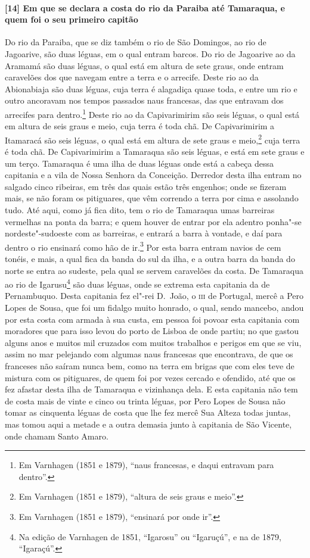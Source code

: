 \begin{linenumbers}
\paragraph{[14] Em que se declara a costa do rio da Paraiba até Tamaraqua, e quem foi o seu
primeiro capitão} \quad
Do rio da Paraiba, que se diz também o rio de São Domingos, ao rio de Jagoarive, são duas
léguas, em o qual entram barcos. Do rio de Jagoarive ao da Aramamá são duas léguas, o qual
está em altura de sete graus, onde entram caravelões dos que navegam entre a terra e o
arrecife. Deste rio ao da Abionabiaja são duas léguas, cuja terra é alagadiça quase toda,
e entre um rio e outro ancoravam nos tempos passados naus francesas, das que entravam dos
arrecifes para dentro.\footnote{ Em Varnhagen (1851 e 1879), ``naus francesas, e daqui
entravam para dentro''.} Deste rio ao da Capivarimirim são seis léguas, o qual está em
altura de seis graus e meio, cuja terra é toda chã. De Capivarimirim a Itamaracá são seis
léguas, o qual está em altura de sete graus e meio,\footnote{ Em Varnhagen (1851 e 1879),
``altura de seis graus e meio''.} cuja terra é toda chã. De Capivarimirim a Tamaraqua são
seis léguas, e está em sete graus e um terço. Tamaraqua é uma ilha de duas léguas onde
está a cabeça dessa capitania e a vila de Nossa Senhora da Conceição. Derredor desta ilha
entram no salgado cinco ribeiras, em três das quais estão três engenhos; onde se fizeram
mais, se não foram os pitiguares, que vêm correndo a terra por cima e assolando tudo. Até
aqui, como já fica dito, tem o rio de Tamaraqua umas barreiras vermelhas na ponta da
barra; e quem houver de entrar por ela adentro ponha"-se nordeste"-sudoeste com as
barreiras, e entrará a barra à vontade, e daí para dentro o rio ensinará como hão de
ir.\footnote{ Em Varnhagen (1851 e 1879), ``ensinará por onde ir''.} Por esta barra entram
navios de cem tonéis, e mais, a qual fica da banda do sul da ilha, e a outra barra da
banda do norte se entra ao sudeste, pela qual se servem caravelões da costa. De Tamaraqua
ao rio de Igarusu\footnote{ Na edição de Varnhagen de 1851, ``Igarosu'' ou ``Igaruçú'', e
na de 1879, ``Igaraçú''.} são duas léguas, onde se extrema esta capitania da de
Pernambuquo. Desta capitania fez el"-rei D.~João, o \textsc{iii} de Portugal, mercê a Pero
Lopes de Sousa, que foi um fidalgo muito honrado, o qual, sendo mancebo, andou por esta
costa com armada à sua custa, em pessoa foi povoar esta capitania com moradores que para
isso levou do porto de Lisboa de onde partiu; no que gastou alguns anos e muitos mil
cruzados com muitos trabalhos e perigos em que se viu, assim no mar pelejando com algumas
naus francesas que encontrava, de que os franceses não saíram nunca bem, como na terra em
brigas que com eles teve de mistura com os pitiguares, de quem foi por vezes cercado e
ofendido, até que os fez afastar desta ilha de Tamaraqua e vizinhança dela. E esta
capitania não tem de costa mais de vinte e cinco ou trinta léguas, por Pero Lopes de Sousa
não tomar as cinquenta léguas de costa que lhe fez mercê Sua Alteza todas juntas, mas
tomou aqui a metade e a outra demasia junto à capitania de São Vicente, onde chamam Santo
Amaro.


\end{linenumbers}
